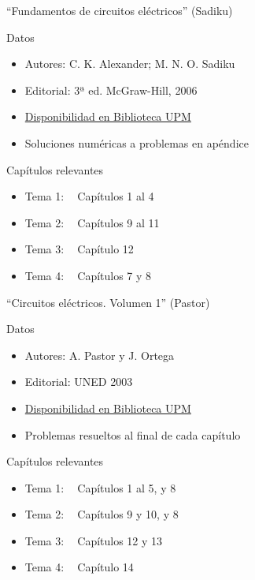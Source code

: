 \documentclass[aspectratio=169, usenames,svgnames,dvipsnames]{beamer}
\begin{document}
\begin{frame}{``Fundamentos de circuitos eléctricos'' (\alert{Sadiku})}
    \begin{block}{Datos}
        \begin{itemize}
        \item Autores: C. K. Alexander; M. N. O. Sadiku
        \item Editorial: 3ª ed. McGraw-Hill, 2006
        \item \href{https://ingenio.upm.es/primo-explore/fulldisplay?docid=34UPM\_ALMA2164599810004212\&context=L\&vid=34UPM\_VU1\&search\_scope=TAB1\_SCOPE1\&isFrbr=true\&tab=tab1\&lang=es\_ES}{Disponibilidad en Biblioteca UPM}
        \item Soluciones numéricas a problemas en apéndice
        \end{itemize}
    \end{block}
    
    \begin{block}{Capítulos relevantes}
        \begin{itemize}
        \item Tema 1: $\;\;$ Capítulos 1 al 4
        \item Tema 2: $\;\;$ Capítulos 9 al 11
        \item Tema 3: $\;\;$ Capítulo 12
        \item Tema 4: $\;\;$ Capítulos 7 y 8
        \end{itemize}
        \end{block}
\end{frame}


\begin{frame}{``Circuitos eléctricos. Volumen 1'' (\alert{Pastor})}
    \begin{block}{Datos}
        \begin{itemize}
        \item Autores: A. Pastor y J. Ortega
        \item Editorial: UNED 2003
        \item \href{https://ingenio.upm.es/primo-explore/fulldisplay?docid=34UPM\_ALMA2148217180004212\&context=L\&vid=34UPM\_VU1\&search\_scope=TAB1\_SCOPE1\&tab=tab1\&lang=es\_ES}{Disponibilidad en Biblioteca UPM}
        \item Problemas resueltos al final de cada capítulo
        \end{itemize}
    \end{block}
    
    \begin{block}{Capítulos relevantes}
        \begin{itemize}
        \item Tema 1: $\;\;$ Capítulos 1 al 5, y 8
        \item Tema 2: $\;\;$ Capítulos 9 y 10, y 8
        \item Tema 3: $\;\;$ Capítulos 12 y 13
        \item Tema 4: $\;\;$ Capítulo 14
        \end{itemize}
    \end{block}
\end{frame}
\end{document}
